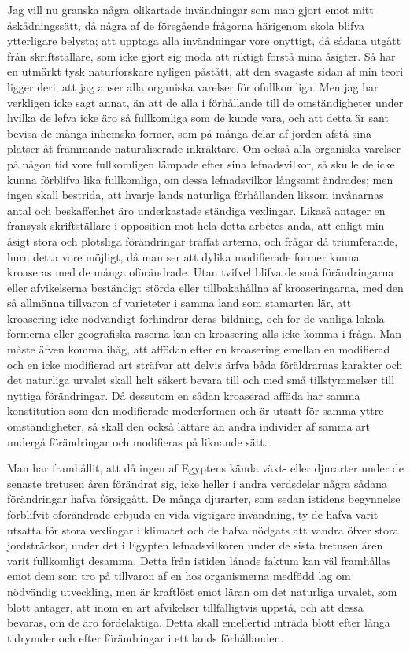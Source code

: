 Jag vill nu granska några olikartade invändningar som man gjort emot mitt åskådningssätt, då några af de föregående frågorna härigenom skola blifva ytterligare belysta; att upptaga alla invändningar vore onyttigt, då sådana utgått från skriftställare, som icke gjort sig möda att riktigt förstå mina åsigter. Så har en utmärkt tysk naturforskare nyligen påstått, att den svagaste sidan af min teori ligger deri, att jag anser alla organiska varelser för ofullkomliga. Men jag har verkligen icke sagt annat, än att de alla i förhållande till de omständigheter under hvilka de lefva icke äro så fullkomliga som de kunde vara, och att detta är sant bevisa de många inhemska former, som på många delar af jorden afstå sina platser åt främmande naturaliserade inkräktare. Om också alla organiska varelser på någon tid vore fullkomligen lämpade efter sina lefnadsvilkor, så skulle de icke kunna förblifva lika fullkomliga, om dessa lefnadsvilkor långsamt ändrades; men ingen skall bestrida, att hvarje lands naturliga förhållanden liksom invånarnas antal och beskaffenhet äro underkastade ständiga vexlingar. Likaså antager en fransysk skriftställare i opposition mot hela detta arbetes anda, att enligt min åsigt stora och plötsliga förändringar träffat arterna, och frågar då triumferande, huru detta vore möjligt, då man ser att dylika modifierade former kunna kroaseras med de många oförändrade. Utan tvifvel blifva de små förändringarna eller afvikelserna beständigt störda eller tillbakahållna af kroaseringarna, med den så allmänna tillvaron af varieteter i samma land som stamarten lär, att kroasering icke nödvändigt förhindrar deras bildning, och för de vanliga lokala formerna eller geografiska raserna kan en kroasering alls icke komma i fråga. Man måste äfven komma ihåg, att affödan efter en kroasering emellan en modifierad och en icke modifierad art sträfvar att delvis ärfva båda föräldrarnas karakter och det naturliga urvalet skall helt säkert bevara till och med små tillstymmelser till nyttiga förändringar. Då dessutom en sådan kroaserad afföda har samma konstitution som den modifierade moderformen och är utsatt för samma yttre omständigheter, så skall den också lättare än andra individer af samma art undergå förändringar och modifieras på liknande sätt.

Man har framhållit, att då ingen af Egyptens kända växt- eller djurarter under de senaste tretusen åren förändrat sig, icke heller i andra verdsdelar några sådana förändringar hafva försiggått. De många djurarter, som sedan istidens begynnelse förblifvit oförändrade erbjuda en vida vigtigare invändning, ty de hafva varit utsatta för stora vexlingar i klimatet och de hafva nödgats att vandra öfver stora jordsträckor, under det i Egypten lefnadsvilkoren under de sista tretusen åren varit fullkomligt desamma. Detta från istiden lånade faktum kan väl framhållas emot dem som tro på tillvaron af en hos organismerna medfödd lag om nödvändig utveckling, men är kraftlöst emot läran om det naturliga urvalet, som blott antager, att inom en art afvikelser tillfälligtvis uppstå, och att dessa bevaras, om de äro fördelaktiga. Detta skall emellertid inträda blott efter långa tidrymder och efter förändringar i ett lands förhållanden.

